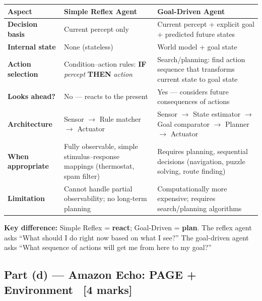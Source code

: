 \documentclass[12pt, a4paper]{article}
\newenvironment{answerbox}{\begin{mdframed}[style=answerframe]}{\end{mdframed}}
\begin{document}
\begin{center}
\renewcommand{\arraystretch}{1.5}
\begin{tabular}{p{4.5cm}|p{5.5cm}|p{5.5cm}}
\toprule
\textbf{Aspect} & \textbf{Simple Reflex Agent} & \textbf{Goal-Driven Agent} \\
\midrule
\textbf{Decision basis} &
  Current percept only &
  Current percept + explicit goal + predicted future states \\
\midrule
\textbf{Internal state} &
  None (stateless) &
  World model + goal state \\
\midrule
\textbf{Action selection} &
  Condition–action rules: \textbf{IF} \textit{percept} \textbf{THEN} \textit{action} &
  Search/planning: find action sequence that transforms current state to goal state \\
\midrule
\textbf{Looks ahead?} &
  No — reacts to the present &
  Yes — considers future consequences of actions \\
\midrule
\textbf{Architecture} &
  Sensor $\to$ Rule matcher $\to$ Actuator &
  Sensor $\to$ State estimator $\to$ Goal comparator $\to$ Planner $\to$ Actuator \\
\midrule
\textbf{When appropriate} &
  Fully observable, simple stimulus–response mappings (thermostat, spam filter) &
  Requires planning, sequential decisions (navigation, puzzle solving, route finding) \\
\midrule
\textbf{Limitation} &
  Cannot handle partial observability; no long-term planning &
  Computationally more expensive; requires search/planning algorithms \\
\bottomrule
\end{tabular}
\end{center}

\begin{answerbox}
\textbf{Key difference:} Simple Reflex = \textbf{react}; Goal-Driven = \textbf{plan}. The reflex agent asks ``What should I do right now based on what I see?'' The goal-driven agent asks ``What sequence of actions will get me from here to my goal?''
\end{answerbox}

\subsection{Part (d) — Amazon Echo: PAGE + Environment \ [4 marks]}
\end{document}
